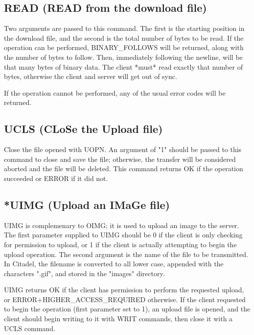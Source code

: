 \subsection{READ (READ from the download file)}

 Two arguments are passed to this command.  The first is the starting position
in the download file, and the second is the total number of bytes to be
read.  If the operation can be performed, BINARY_FOLLOWS will be returned,
along with the number of bytes to follow.  Then, immediately following the
newline, will be that many bytes of binary data.  The client *must* read
exactly that number of bytes, otherwise the client and server will get out
of sync.

 If the operation cannot be performed, any of the usual error codes will be
returned.



\subsection{UCLS (CLoSe the Upload file)}

 Close the file opened with UOPN.  An argument of "1" should be passed to
this command to close and save the file; otherwise, the transfer will be
considered aborted and the file will be deleted.  This command returns OK
if the operation succeeded or ERROR if it did not.



\subsection{*UIMG (Upload an IMaGe file)}

 UIMG is complemenary to OIMG; it is used to upload an image to the server.
The first parameter supplied to UIMG should be 0 if the client is only checking
for permission to upload, or 1 if the client is actually attempting to begin
the upload operation.  The second argument is the name of the file to be
transmitted.  In Citadel, the filename is converted to all lower case,
appended with the characters ".gif", and stored in the "images" directory.

 UIMG returns OK if the client has permission to perform the requested upload,
or ERROR+HIGHER_ACCESS_REQUIRED otherwise.  If the client requested to begin
the operation (first parameter set to 1), an upload file is opened, and the
client should begin writing to it with WRIT commands, then close it with a
UCLS command.

